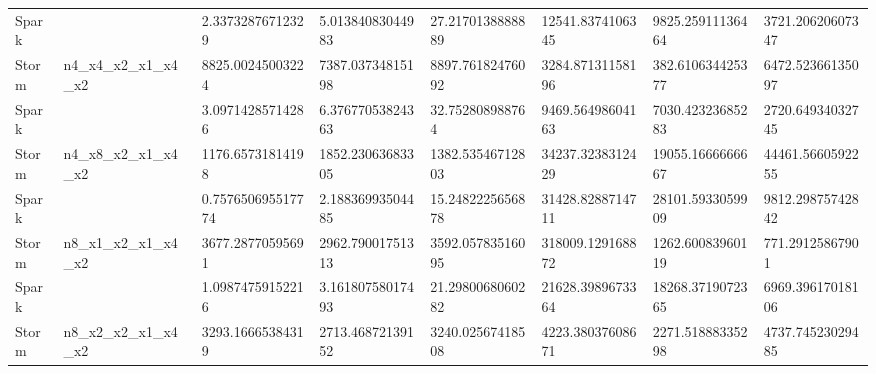 \documentclass[ppgc,diss,english]{iiufrgs}
\begin{document}
\begin{table}[H]
\begin{tabular}{|l|l|l|l|l|l|l|l|}
Spark    &                                          & 2.33732876712329                         & 5.01384083044983                         & 27.2170138888889                         & 12541.8374106345                         & 9825.25911136464                         & \cellcolor[HTML]{67FD9A}3721.20620607347 \\ \cline{1-1} \cline{3-8} 
Storm    & \multirow{-2}{*}{n4\_x4\_x2\_x1\_x4\_x2} & \cellcolor[HTML]{67FD9A}8825.00245003224 & \cellcolor[HTML]{67FD9A}7387.03734815198 & \cellcolor[HTML]{67FD9A}8897.76182476092 & \cellcolor[HTML]{67FD9A}3284.87131158196 & \cellcolor[HTML]{67FD9A}382.610634425377 & 6472.52366135097                         \\ \hline
Spark    &                                          & 3.09714285714286                         & 6.37677053824363                         & 32.752808988764                          & \cellcolor[HTML]{67FD9A}9469.56498604163 & \cellcolor[HTML]{67FD9A}7030.42323685283 & \cellcolor[HTML]{67FD9A}2720.64934032745 \\ \cline{1-1} \cline{3-8} 
Storm    & \multirow{-2}{*}{n4\_x8\_x2\_x1\_x4\_x2} & \cellcolor[HTML]{67FD9A}1176.65731814198 & \cellcolor[HTML]{67FD9A}1852.23063683305 & \cellcolor[HTML]{67FD9A}1382.53546712803 & 34237.3238312429                         & 19055.1666666667                         & 44461.5660592255                         \\ \hline
Spark    &                                          & 0.757650695517774                        & 2.18836993504485                         & 15.2482225656878                         & \cellcolor[HTML]{67FD9A}31428.8288714711 & 28101.5933059909                         & 9812.29875742842                         \\ \cline{1-1} \cline{3-8} 
Storm    & \multirow{-2}{*}{n8\_x1\_x2\_x1\_x4\_x2} & \cellcolor[HTML]{67FD9A}3677.28770595691 & \cellcolor[HTML]{67FD9A}2962.79001751313 & \cellcolor[HTML]{67FD9A}3592.05783516095 & 318009.129168872                         & \cellcolor[HTML]{67FD9A}1262.60083960119 & \cellcolor[HTML]{67FD9A}771.29125867901  \\ \hline
Spark    &                                          & 1.09874759152216                         & 3.16180758017493                         & 21.2980068060282                         & 21628.3989673364                         & 18268.3719072365                         & 6969.39617018106                         \\ \cline{1-1} \cline{3-8} 
Storm    & \multirow{-2}{*}{n8\_x2\_x2\_x1\_x4\_x2} & \cellcolor[HTML]{67FD9A}3293.16665384319 & \cellcolor[HTML]{67FD9A}2713.46872139152 & \cellcolor[HTML]{67FD9A}3240.02567418508 & \cellcolor[HTML]{67FD9A}4223.38037608671 & \cellcolor[HTML]{67FD9A}2271.51888335298 & \cellcolor[HTML]{67FD9A}4737.74523029485 \\ \hline

\end{tabular}
\end{table}
\end{document}
